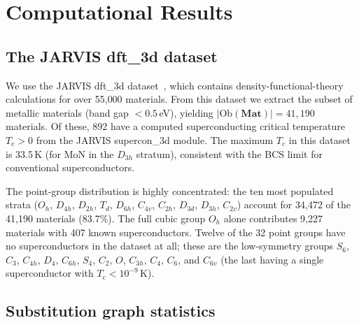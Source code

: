 \documentclass[12pt,a4paper]{article}
\theoremstyle{plain}
\theoremstyle{definition}
\theoremstyle{remark}
\newcommand{\Tc}{T_{\mathrm{c}}}
\newcommand{\Matl}{\mathbf{Mat}}
\newcommand{\Ob}{\mathrm{Ob}}
\begin{document}
\section{Computational Results}\label{sec:computational}

\subsection{The JARVIS dft\_3d dataset}

We use the JARVIS dft\_3d dataset~\cite{placeholder_JARVIS}, which contains
density-functional-theory calculations for over 55{,}000 materials.  From
this dataset we extract the subset of metallic materials (band gap
$< 0.5$\,eV), yielding $|\Ob(\Matl)| = 41{,}190$ materials.  Of these,
892 have a computed superconducting critical temperature $\Tc > 0$ from the
JARVIS supercon\_3d module.  The maximum $\Tc$ in this dataset is
33.5\,K (for MoN in the $D_{3h}$ stratum), consistent with the BCS limit
for conventional superconductors.

The point-group distribution is highly concentrated: the ten most populated
strata ($O_h$, $D_{4h}$, $D_{2h}$, $T_d$, $D_{6h}$, $C_{4v}$, $C_{2h}$,
$D_{3d}$, $D_{3h}$, $C_{2v}$) account for 34{,}472 of the 41{,}190
materials (83.7\%).  The full cubic group $O_h$ alone contributes 9{,}227
materials with 407 known superconductors.  Twelve of the 32 point groups
have no superconductors in the dataset at all; these are the low-symmetry
groups $S_6$, $C_3$, $C_{4h}$, $D_4$, $C_{6h}$, $S_4$, $C_2$, $O$,
$C_{3h}$, $C_4$, $C_6$, and $C_{6v}$ (the last having a single
superconductor with $\Tc < 10^{-9}$\,K).

\subsection{Substitution graph statistics}
\end{document}
